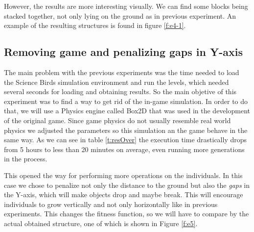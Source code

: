 \documentclass[runningheads,a4paper]{llncs}
\begin{document}
However, the results are more interesting visually. We can find some blocks 
being stacked together, not only lying on the ground as in previous 
experiment. An example of the resulting structures is found in figure \ref{f:e4-1}.

\subsection{Removing game and penalizing gaps in Y-axis}\label{E5}
The main problem with the previous experiments was the time needed to
load the Science Birds simulation environment and run the levels,
which needed several seconds for loading and obtaining results. So the
main objetive of this experiment was to find a way to get
rid of the in-game simulation. In order to do that, we will use a Physics engine
called Box2D \cite{catto2011box2d} that was used in the development of the original game.
Since game physics do not usually resemble real world physics we adjusted
the parameters so this simulation an the game behave in the same way.
As we can see in table \ref{t:resOver} the execution time drastically
drops from 5 hours to less than 20 minutes on average, even running
more generations in the process.


This opened the way for performing more 
operations on the individuals. In this case we chose to penalize
not only the distance to the ground but also the \textit{gaps} in the
Y-axis, which will make objects drop and maybe break.
This will encourage individuals to grow vertically and not only horizontally
like in previous experiments. This changes the fitness function, so we
will have to compare by the actual obtained structure, one of which is
shown in Figure \ref{f:e5}.
\end{document}

